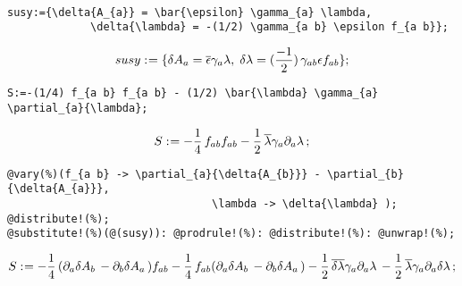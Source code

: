 \documentclass[11pt]{article}
\def\specialcolon{\mathrel{\mathop{:}}\hspace{-.5em}}
\renewcommand{\bar}[1]{\overline{#1}}
\begin{document}
\\
{\color[named]{Blue}\begin{verbatim}
susy:={\delta{A_{a}} = \bar{\epsilon} \gamma_{a} \lambda,
             \delta{\lambda} = -(1/2) \gamma_{a b} \epsilon f_{a b}};
\end{verbatim}}
\begin{dmath*}[compact, spread=2pt]
susy\specialcolon{}= \{\delta{{A}_{a}} = \bar{\epsilon} {\gamma}_{a} \lambda,\; \delta{\lambda} = (\frac{-1}{2})\, {\gamma}_{a b} \epsilon {f}_{a b}\};
\end{dmath*}
{\color[named]{Blue}\begin{verbatim}
S:=-(1/4) f_{a b} f_{a b} - (1/2) \bar{\lambda} \gamma_{a} \partial_{a}{\lambda};
\end{verbatim}}
\begin{dmath*}[compact, spread=2pt]
S\specialcolon{}=  - \frac{1}{4}\, {f}_{a b} {f}_{a b} - \frac{1}{2}\, \bar{\lambda} {\gamma}_{a} {\partial}_{a}{\lambda}\, ;
\end{dmath*}
{\color[named]{Blue}\begin{verbatim}
@vary(%)(f_{a b} -> \partial_{a}{\delta{A_{b}}} - \partial_{b}{\delta{A_{a}}},
                                \lambda -> \delta{\lambda} );
@distribute!(%);
@substitute!(%)(@(susy)): @prodrule!(%): @distribute!(%): @unwrap!(%);
\end{verbatim}}
\begin{dmath*}[compact, spread=2pt]
S\specialcolon{}=  - \frac{1}{4}\, ({\partial}_{a}{\delta{{A}_{b}}}\,  - {\partial}_{b}{\delta{{A}_{a}}}\, ) {f}_{a b} - \frac{1}{4}\, {f}_{a b} ({\partial}_{a}{\delta{{A}_{b}}}\,  - {\partial}_{b}{\delta{{A}_{a}}}\, ) - \frac{1}{2}\, \bar{\delta{\lambda}} {\gamma}_{a} {\partial}_{a}{\lambda}\,  - \frac{1}{2}\, \bar{\lambda} {\gamma}_{a} {\partial}_{a}{\delta{\lambda}}\, ;
\end{dmath*}
\end{document}
